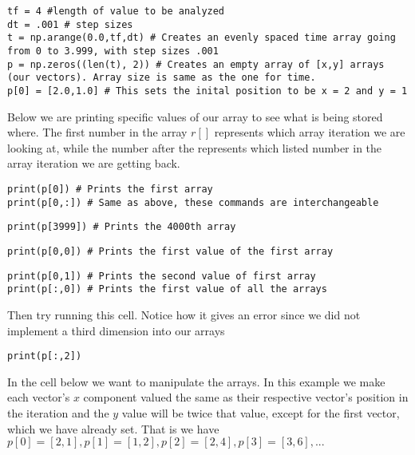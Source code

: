 \documentclass[%
oneside,                 %
final,                   %
10pt]{article}
\begin{document}
\begin{verbatim}
tf = 4 #length of value to be analyzed
dt = .001 # step sizes
t = np.arange(0.0,tf,dt) # Creates an evenly spaced time array going from 0 to 3.999, with step sizes .001
p = np.zeros((len(t), 2)) # Creates an empty array of [x,y] arrays (our vectors). Array size is same as the one for time.
p[0] = [2.0,1.0] # This sets the inital position to be x = 2 and y = 1
\end{verbatim}

Below we are printing specific values of our array to see what is being
stored where. The first number in the array $r[]$ represents which array
iteration we are looking at, while the number after the  represents
which listed number in the array iteration we are getting back. 


\begin{verbatim}
print(p[0]) # Prints the first array
print(p[0,:]) # Same as above, these commands are interchangeable 
\end{verbatim}
\begin{verbatim}
print(p[3999]) # Prints the 4000th array
\end{verbatim}

\begin{verbatim}
print(p[0,0]) # Prints the first value of the first array
\end{verbatim}
\begin{verbatim}
print(p[0,1]) # Prints the second value of first array
print(p[:,0]) # Prints the first value of all the arrays
\end{verbatim}
Then try running this cell. Notice how it gives an error since we did not implement a third dimension into our arrays
\begin{verbatim}
print(p[:,2])
\end{verbatim}

In the cell below we want to manipulate the arrays.
In this example we make each vector's $x$ component valued the same as their respective vector's position in the iteration and the $y$ value will be twice that value, except for  the first vector, which we have already set. 
That is we have $p[0] = [2,1], p[1] = [1,2], p[2] = [2,4], p[3] = [3,6], ...$
\end{document}
